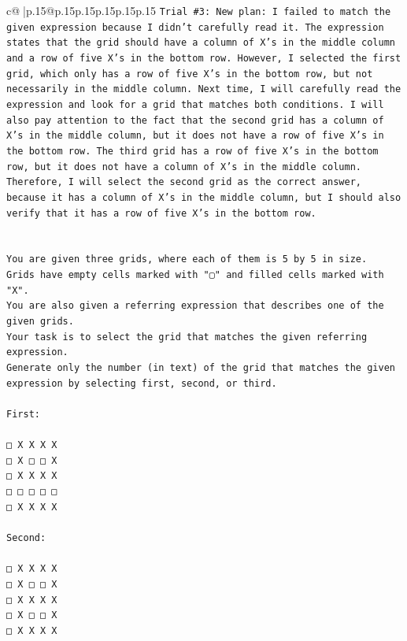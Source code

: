 \documentclass{article}
\begin{document}
{\begin{supertabular}{c@{$\;$}|p{.15\linewidth}@{}p{.15\linewidth}p{.15\linewidth}p{.15\linewidth}p{.15\linewidth}p{.15\linewidth}}
{{{\texttt{Trial \#3: New plan: I failed to match the given expression because I didn't carefully read it. The expression states that the grid should have a column of X's in the middle column and a row of five X's in the bottom row. However, I selected the first grid, which only has a row of five X's in the bottom row, but not necessarily in the middle column. Next time, I will carefully read the expression and look for a grid that matches both conditions. I will also pay attention to the fact that the second grid has a column of X's in the middle column, but it does not have a row of five X's in the bottom row. The third grid has a row of five X's in the bottom row, but it does not have a column of X's in the middle column. Therefore, I will select the second grid as the correct answer, because it has a column of X's in the middle column, but I should also verify that it has a row of five X's in the bottom row.} \\
\\ 
\\ 
\texttt{You are given three grids, where each of them is 5 by 5 in size.} \\
\texttt{Grids have empty cells marked with "▢" and filled cells marked with "X".} \\
\texttt{You are also given a referring expression that describes one of the given grids.} \\
\texttt{Your task is to select the grid that matches the given referring expression.} \\
\texttt{Generate only the number (in text) of the grid that matches the given expression by selecting first, second, or third.} \\
\\ 
\texttt{First:} \\
\\ 
\texttt{□ X X X X} \\
\texttt{□ X □ □ X} \\
\texttt{□ X X X X} \\
\texttt{□ □ □ □ □} \\
\texttt{□ X X X X} \\
\\ 
\texttt{Second:} \\
\\ 
\texttt{□ X X X X} \\
\texttt{□ X □ □ X} \\
\texttt{□ X X X X} \\
\texttt{□ X □ □ X} \\
\texttt{□ X X X X} \\
}}}
\end{supertabular}}
\end{document}
